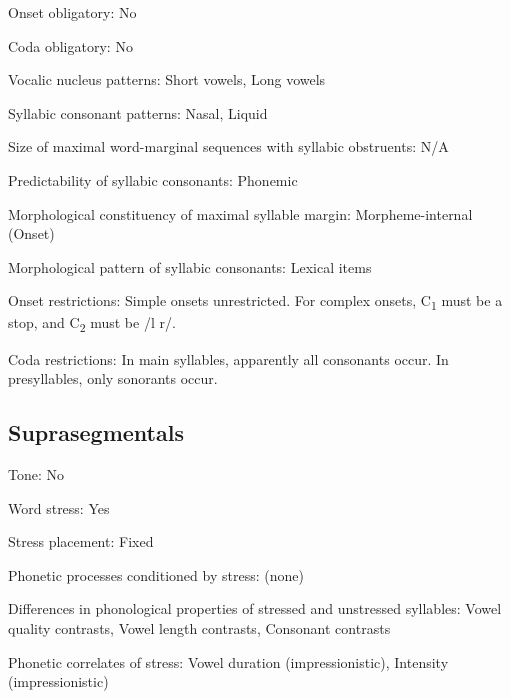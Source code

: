 {\begin{appendixdesc}
\item[Onset obligatory:] No

\item[Coda obligatory:] No

\item[Vocalic nucleus patterns:] Short vowels, Long vowels

\item[Syllabic consonant patterns:] Nasal, Liquid

\item[Size of maximal word-marginal sequences with syllabic obstruents:] N/A

\item[Predictability of syllabic consonants:] Phonemic

\item[Morphological constituency of maximal syllable margin:] Morpheme-internal (Onset)

\item[Morphological pattern of syllabic consonants:] Lexical items

\item[Onset restrictions:] Simple onsets unrestricted. For complex onsets, C\textsubscript{1} must be a stop, and C\textsubscript{2} must be /l r/. 

\item[Coda restrictions:] In main syllables, apparently all consonants occur. In presyllables, only sonorants occur.
\end{appendixdesc}
\subsection*{Suprasegmentals}
\begin{appendixdesc}
\item[Tone:] No

\item[Word stress:] Yes

\item[Stress placement:] Fixed

\item[Phonetic processes conditioned by stress:] (none)

\item[Differences in phonological properties of stressed and unstressed syllables:] Vowel quality contrasts, Vowel length contrasts, Consonant contrasts

\item[Phonetic correlates of stress:] Vowel duration (impressionistic), Intensity (impressionistic)
\end{appendixdesc}
}
